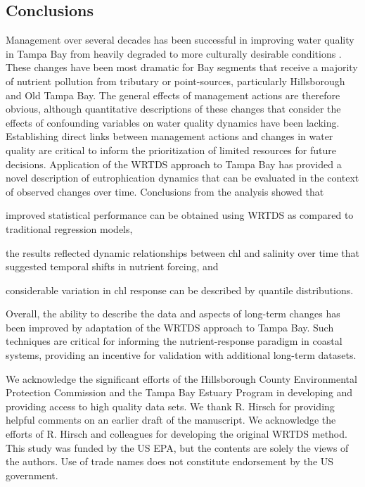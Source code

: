 \documentclass{svjour3}\usepackage[]{graphicx}\usepackage[]{color}
\begin{document}
\subsection{Conclusions}

Management over several decades has been successful in improving water quality in Tampa Bay from heavily degraded to more culturally desirable conditions \cite{Greening06}.  These changes have been most dramatic for Bay segments that receive a majority of nutrient pollution from tributary or point-sources, particularly Hillsborough and Old Tampa Bay.  The general effects of management actions are therefore obvious, although quantitative descriptions of these changes that consider the effects of confounding variables on water quality dynamics have been lacking.  Establishing direct links between management actions and changes in water quality are critical to inform the prioritization of limited resources for future decisions.  Application of the \ac{WRTDS} approach to Tampa Bay has provided a novel description of eutrophication dynamics that can be evaluated in the context of observed changes over time.  Conclusions from the analysis showed that\begin{inparaenum}[1\upshape)]
\item improved statistical performance can be obtained using \ac{WRTDS} as compared to traditional regression models,
\item the results reflected dynamic relationships between \ac{chl} and salinity over time that suggested temporal shifts in nutrient forcing, and 
\item considerable variation in \ac{chl} response can be described by quantile distributions.
\end{inparaenum}
Overall, the ability to describe the data and aspects of long-term changes has been improved by adaptation of the \ac{WRTDS} approach to Tampa Bay. Such techniques are critical for informing the nutrient-response paradigm in coastal systems, providing an incentive for validation with additional long-term datasets.

\begin{acknowledgements}
We acknowledge the significant efforts of the Hillsborough County Environmental Protection Commission and the Tampa Bay Estuary Program in developing and providing access to high quality data sets.  We thank R. Hirsch for providing helpful comments on an earlier draft of the manuscript.  We acknowledge the efforts of R. Hirsch and colleagues for developing the original \ac{WRTDS} method. This study was funded by the US \acl{EPA}, but the contents are solely the views of the authors.  Use of trade names does not constitute endorsement by the US government.
\end{acknowledgements}
\end{document}
